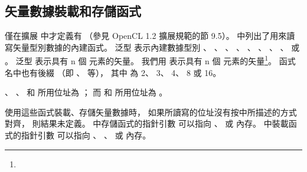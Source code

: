 \subsection[sec:vectorLsFunc]{矢量數據裝載和存儲函式}

\startbuffer
僅在擴展  中才定義有 %
（參見 OpenCL 1.2 擴展規範的節 9.5）。
\stopbuffer
{}中列出了用來讀寫矢量型別數據的內建函式。
泛型  表示內建數據型別
 、 、 、 、
 、 、 、 、
  或 。
泛型  表示具有 n 個  元素的矢量。
我們用  表示具有 n 個  元素的矢量\footnote{\getbuffer}。
函式名中也有後綴  （即 、  等），
其中  為 2、 3、 4、 8 或 16。

\startnotepar
{}、 、  和 
所用位址為 ；
而  和 
所用位址為 。
\stopnotepar

{}

使用這些函式裝載、存儲矢量數據時，
如果所讀寫的位址沒有按中所描述的方式對齊，
則結果未定義。
中存儲函式的指針引數  可以指向
 、  或  內存。
中裝載函式的指針引數  可以指向
 、 、  或  內存。

